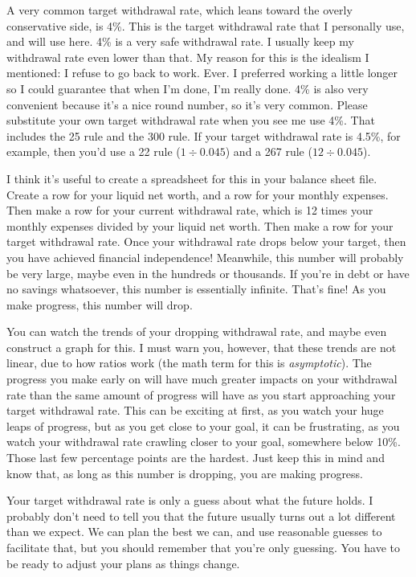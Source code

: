 A very common target withdrawal rate, which leans toward the overly conservative side, is 4\%. This is the target withdrawal rate that I personally use, and will use here. 4\% is a very safe withdrawal rate. I usually keep my withdrawal rate even lower than that. My reason for this is the idealism I mentioned: I refuse to go back to work. Ever. I preferred working a little longer so I could guarantee that when I'm done, I'm really done. 4\% is also very convenient because it's a nice round number, so it's very common. Please substitute your own target withdrawal rate when you see me use 4\%. That includes the 25 rule and the 300 rule. If your target withdrawal rate is 4.5\%, for example, then you'd use a 22 rule ($1 \div 0.045$) and a 267 rule ($12 \div 0.045$).

I think it's useful to create a spreadsheet for this in your balance sheet file. Create a row for your liquid net worth, and a row for your monthly expenses. Then make a row for your current withdrawal rate, which is 12 times your monthly expenses divided by your liquid net worth. Then make a row for your target withdrawal rate. Once your withdrawal rate drops below your target, then you have achieved financial independence! Meanwhile, this number will probably be very large, maybe even in the hundreds or thousands. If you're in debt or have no savings whatsoever, this number is essentially infinite. That's fine! As you make progress, this number will drop.

You can watch the trends of your dropping withdrawal rate, and maybe even construct a graph for this. I must warn you, however, that these trends are not linear, due to how ratios work (the math term for this is \emph{asymptotic}). The progress you make early on will have much greater impacts on your withdrawal rate than the same amount of progress will have as you start approaching your target withdrawal rate. This can be exciting at first, as you watch your huge leaps of progress, but as you get close to your goal, it can be frustrating, as you watch your withdrawal rate crawling closer to your goal, somewhere below 10\%. Those last few percentage points are the hardest. Just keep this in mind and know that, as long as this number is dropping, you are making progress.

Your target withdrawal rate is only a guess about what the future holds. I probably don't need to tell you that the future usually turns out a lot different than we expect. We can plan the best we can, and use reasonable guesses to facilitate that, but you should remember that you're only guessing. You have to be ready to adjust your plans as things change.

